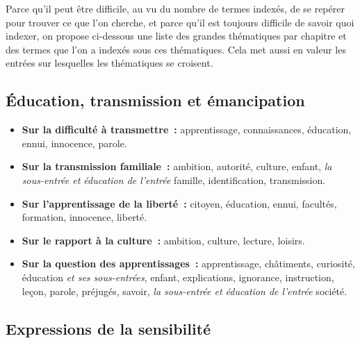 Parce qu'il peut être difficile, au vu du nombre de termes indexés, de se repérer pour trouver ce que l'on cherche, et parce qu'il est toujours difficile de savoir quoi indexer, on propose ci-dessous une liste des grandes thématiques par chapitre et des termes que l'on a indexés sous ces thématiques. Cela met aussi en valeur les entrées sur lesquelles les thématiques se croisent.

\subsection{Éducation, transmission et émancipation}
\begin{itemize}\setlength{\itemsep}{6pt}

\item \textbf{Sur la difficulté à transmettre~:} apprentissage, connaissances, éducation, ennui, innocence, parole.

\item \textbf{Sur la transmission familiale~:} ambition, autorité, culture, enfant, \textit{la sous-entrée \emph{et éducation} de l'entrée} famille, identification, transmission.

\item \textbf{Sur l'apprentissage de la liberté~:} citoyen, éducation, ennui, facultés, formation, innocence, liberté.

\item \textbf{Sur le rapport à la culture~:} ambition, culture, lecture, loisirs.

\item \textbf{Sur la question des apprentissages~:} apprentissage, châtiments, curiosité, éducation \textit{et ses sous-entrées}, enfant, explications, ignorance, instruction, leçon, parole, préjugés, savoir, \textit{la sous-entrée \emph{et éducation} de l'entrée} société.

\end{itemize}


\subsection{Expressions de la sensibilité}

